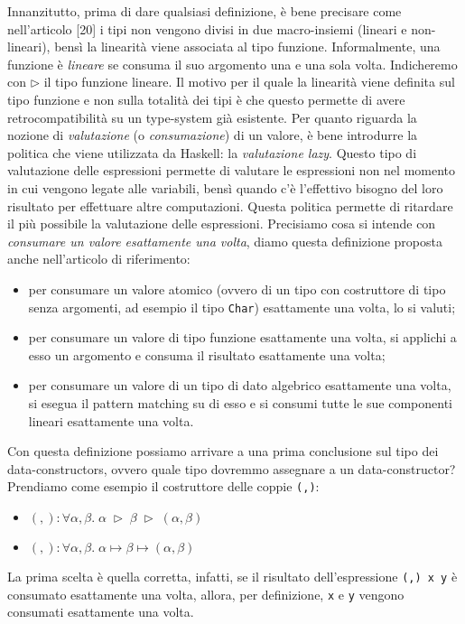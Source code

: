 \documentclass[10pt,a4paper]{article}
\begin{document}
Innanzitutto, prima di dare qualsiasi definizione, è bene precisare
come nell'articolo [20] i tipi non vengono divisi in due macro-insiemi (lineari e non-lineari), bensì la linearità viene
associata al tipo funzione. Informalmente, una funzione è \textit{lineare} se consuma il suo argomento una e una sola
volta. Indicheremo con $ \triangleright $ il tipo funzione lineare. Il motivo per il quale la linearità viene definita
sul tipo funzione e non sulla totalità dei tipi è che questo permette di avere retrocompatibilità su un type-system già
esistente. Per quanto riguarda la nozione di \textit{valutazione} (o \textit{consumazione}) di un valore, è bene
introdurre la politica che viene utilizzata da Haskell: la \textit{valutazione lazy}. Questo tipo di valutazione delle
espressioni permette di valutare le espressioni non nel momento in cui vengono legate alle variabili,
bensì quando c'è l'effettivo bisogno del loro risultato per effettuare altre computazioni. Questa politica permette di
ritardare il più possibile la valutazione delle espressioni.
Precisiamo cosa si intende con \textit{consumare un valore esattamente una volta}, diamo questa
definizione proposta anche nell'articolo di riferimento:
\begin{itemize}
    \item per consumare un valore atomico (ovvero di un tipo con costruttore di tipo senza argomenti, ad esempio il
    tipo \texttt{Char}) esattamente una volta, lo si valuti;
    \item per consumare un valore di tipo funzione esattamente una volta, si applichi a esso un argomento e consuma
    il risultato esattamente una volta;
    \item per consumare un valore di un tipo di dato algebrico esattamente una volta, si esegua il pattern matching su
    di esso e si consumi tutte le sue componenti lineari esattamente una volta.
\end{itemize}
Con questa definizione possiamo arrivare a una prima conclusione sul tipo dei data-constructors, ovvero quale tipo
dovremmo assegnare a un data-constructor? Prendiamo come esempio il costruttore delle coppie \texttt{(,)}:
\begin{itemize}
    \item $ (,) : \forall \alpha, \beta. \; \alpha \; \triangleright \; \beta \; \triangleright \; (\alpha, \beta) $
    \item $ (,) : \forall \alpha, \beta. \; \alpha \mapsto \beta \mapsto (\alpha, \beta) $
\end{itemize}
La prima scelta è quella corretta, infatti, se il risultato dell'espressione \texttt{(,) x y} è consumato esattamente
una volta, allora, per definizione, \texttt{x} e \texttt{y} vengono consumati esattamente una volta.
\end{document}
